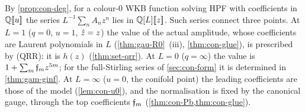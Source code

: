 \begin{rmk}
\label{rmk:con-points}
By \cref{prop:con-deg}, for a colour-$0$ WKB function solving HPF with coefficients in $\mathbb{Q}[\![ u ]\!]$ the series $L^{-1}\sum_nA_nz^n$ lies in $\mathbb{Q}[L][\![ z ]\!]$. Such series connect three points. At $L=1$ ($q=0$, $u=1$, $\hat{z}=z$) the value of the actual amplitude, whose coefficients are Laurent polynomials in $L$ (\cref{thm:gau-R0}~(iii), \cref{thm:con-glue}), is prescribed by (QRR): it is $h(z)$ (\cref{thm:set-qrr}). At $L=0$ ($q=\infty$) the value is $1+\sum_m\mathfrak{f}_mz^{5m}$; for the full-Stirling series of \cref{sec:con-form} it is determined in \cref{thm:gam-ginf}. At $L=\infty$ ($u=0$, the conifold point) the leading coefficients are those of the model (\cref{lem:con-u0}), and the normalisation is fixed by the canonical gauge, through the top coefficients $\mathfrak{f}_m$ (\cref{thm:con-Pb,thm:con-glue}).
\end{rmk}


